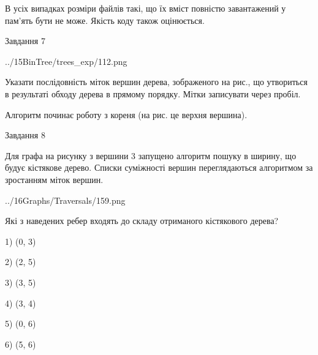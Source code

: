 \documentclass[12pt, ukrainian]{article}
\begin{document}
{В усіх випадках розміри файлів такі, що їх вміст повністю завантажений у пам'ять бути не може. Якість коду також оцінюється.



\vspace{10mm}\par

\newpage
\begin{minipage}[t]{9.7cm}
               
{\begin{center}Завдання {7}\end{center}}
\vspace{-4mm}

\begin{center}
	{../15BinTree/trees_exp/112.png}
\end{center}
Указати послідовність міток вершин дерева, зображеного на рис., що утвориться в результаті обходу дерева в прямому порядку. Мітки записувати через пробіл.\par Алгоритм починає роботу з кореня (на рис. це верхня вершина).\par

\end{minipage}
\vline \hspace{8mm}
\begin{minipage}[t]{8.0cm}
               
{\begin{center}Завдання {8}\end{center}}
\vspace{-4mm}
Для графа на рисунку з вершини 3 запущено алгоритм пошуку в ширину, що будує кістякове дерево. Списки суміжності вершин переглядаються алгоритмом за зростанням міток вершин.\par
\begin{center}
	{../16Graphs/Traversals/159.png}
\end{center}
\par Які з наведених ребер входять до складу отриманого кістякового дерева?\par
1) (0, 3)\par
2) (2, 5)\par
3) (3, 5)\par
4) (3, 4)\par
5) (0, 6)\par
6) (5, 6)\par
{\vskip 15pt} \par


\end{minipage}}
\end{document}

